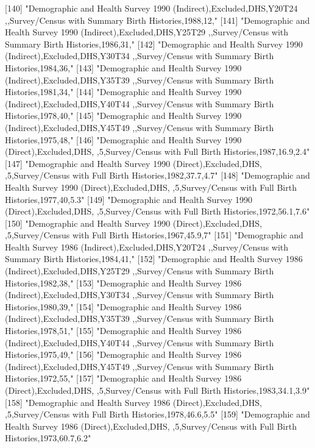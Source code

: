 [140] "Demographic and Health Survey 1990 (Indirect),Excluded,DHS,Y20T24 ,,Survey/Census with Summary Birth Histories,1988,12,"      
[141] "Demographic and Health Survey 1990 (Indirect),Excluded,DHS,Y25T29 ,,Survey/Census with Summary Birth Histories,1986,31,"      
[142] "Demographic and Health Survey 1990 (Indirect),Excluded,DHS,Y30T34 ,,Survey/Census with Summary Birth Histories,1984,36,"      
[143] "Demographic and Health Survey 1990 (Indirect),Excluded,DHS,Y35T39 ,,Survey/Census with Summary Birth Histories,1981,34,"      
[144] "Demographic and Health Survey 1990 (Indirect),Excluded,DHS,Y40T44 ,,Survey/Census with Summary Birth Histories,1978,40,"      
[145] "Demographic and Health Survey 1990 (Indirect),Excluded,DHS,Y45T49 ,,Survey/Census with Summary Birth Histories,1975,48,"      
[146] "Demographic and Health Survey 1990 (Direct),Excluded,DHS, ,5,Survey/Census with Full Birth Histories,1987,16.9,2.4"           
[147] "Demographic and Health Survey 1990 (Direct),Excluded,DHS, ,5,Survey/Census with Full Birth Histories,1982,37.7,4.7"           
[148] "Demographic and Health Survey 1990 (Direct),Excluded,DHS, ,5,Survey/Census with Full Birth Histories,1977,40,5.3"             
[149] "Demographic and Health Survey 1990 (Direct),Excluded,DHS, ,5,Survey/Census with Full Birth Histories,1972,56.1,7.6"           
[150] "Demographic and Health Survey 1990 (Direct),Excluded,DHS, ,5,Survey/Census with Full Birth Histories,1967,45.9,7"             
[151] "Demographic and Health Survey 1986 (Indirect),Excluded,DHS,Y20T24 ,,Survey/Census with Summary Birth Histories,1984,41,"      
[152] "Demographic and Health Survey 1986 (Indirect),Excluded,DHS,Y25T29 ,,Survey/Census with Summary Birth Histories,1982,38,"      
[153] "Demographic and Health Survey 1986 (Indirect),Excluded,DHS,Y30T34 ,,Survey/Census with Summary Birth Histories,1980,39,"      
[154] "Demographic and Health Survey 1986 (Indirect),Excluded,DHS,Y35T39 ,,Survey/Census with Summary Birth Histories,1978,51,"      
[155] "Demographic and Health Survey 1986 (Indirect),Excluded,DHS,Y40T44 ,,Survey/Census with Summary Birth Histories,1975,49,"      
[156] "Demographic and Health Survey 1986 (Indirect),Excluded,DHS,Y45T49 ,,Survey/Census with Summary Birth Histories,1972,55,"      
[157] "Demographic and Health Survey 1986 (Direct),Excluded,DHS, ,5,Survey/Census with Full Birth Histories,1983,34.1,3.9"           
[158] "Demographic and Health Survey 1986 (Direct),Excluded,DHS, ,5,Survey/Census with Full Birth Histories,1978,46.6,5.5"           
[159] "Demographic and Health Survey 1986 (Direct),Excluded,DHS, ,5,Survey/Census with Full Birth Histories,1973,60.7,6.2"           
